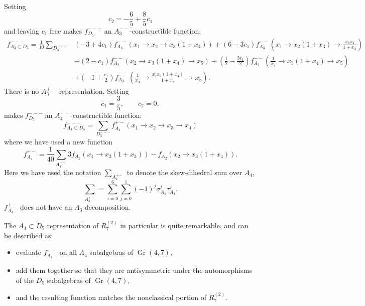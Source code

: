 \documentclass[11pt]{article}
\DeclareMathOperator{\Gr}{Gr}
\def\nl{\nonumber\\}
\begin{document}
Setting 
\begin{equation}
	c_2 = -\frac{6}{5} + \frac{8}{5} c_1
\end{equation}
and leaving $c_1$ free makes $f_{D_5}^{---}$ an $A_3^{--}$-constructible function:
\begin{align}
	f_{A_3\subset D_5}^{---} = \frac{1}{10}\sum_{D_5^{---}}
	&\left(-3+4 c_1\right) f_{A_3}^{--}\left(x_1\to x_2\to x_3 \left(1+x_4\right)\right)
	+\left(6-3 c_1\right) f_{A_3}^{--}\left(x_1\to x_2 \left(1+x_3\right)\to \frac{x_3 x_4}{1+x_3}\right) \nl
	&+\left(2-c_1\right) f_{A_3}^{--}\left(x_2\to x_3 \left(1+x_4\right)\to x_5\right)+\left(\frac{1}{2}
	-\frac{3 c_1}{2}\right) f_{A_3}^{--}\left(\frac{1}{x_4}\to x_3 \left(1+x_4\right)\to x_5\right) \nl
	&+\left(-1+\frac{c_1}{2}\right) f_{A_3}^{--}\left(\frac{1}{x_4}\to \frac{x_2 x_3 \left(1+x_4\right)}{1+x_2}\to x_5\right).
\end{align}
There is no $A_3^{+-}$ representation. Setting 
\begin{equation}
	c_1 = \frac{3}{5}, \qquad c_2 = 0,
\end{equation}
makes $f_{D_5}^{---}$ an $A_4^{+-}$-constructible function:
\begin{equation}
	f_{A_4\subset D_5}^{---} = \sum_{D_5^{---}} f_{A_4}^{+-}(x_1\to x_2\to x_3 \to x_4)
\end{equation}
where we have used a new function
\begin{equation}\label{eq:fa4-def}
	f_{A_4}^{+-} = \frac{1}{40}\sum_{A_4^{+-}}3f_{A_2}(x_1 \to x_2(1+x_3)) - f_{A_2}(x_2\to x_3(1+x_4)).
\end{equation}
Here we have used the notation $\sum_{A_4^{+-}}$ to denote the skew-dihedral sum over $A_4$, 
\begin{equation}
 	\sum_{A_4^{+-}} = \sum_{i=0}^6\sum_{j=0}^1(-1)^j \sigma_{A_4}^i \tau_{A_4}^j.
\end{equation} 
$f_{A_4}^{+-}$ does not have an $A_3$-decomposition. 

The $A_4\subset D_5$ representation of $R^{(2)}_7$ in particular is quite remarkable, and can be described as: 
\begin{itemize}
	\item evaluate $f_{A_4}^{+-}$ on all $A_4$ subalgebras of $\Gr(4,7)$,
	\item add them together so that they are antisymmetric under the automorphisms of the $D_5$ subalgebras of $\Gr(4,7)$,
	\item and the resulting function matches the nonclassical portion of $R^{(2)}_7$.
\end{itemize}
\end{document}
